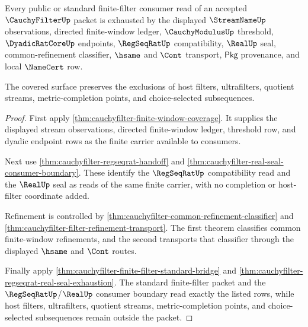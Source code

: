 \begin{theorem}
\label{thm:cauchyfilter-finite-filter-mature-coverage}
Every public or standard finite-filter consumer read of an accepted
$\CauchyFilterUp$ packet is exhausted by the displayed $\StreamNameUp$
observations, directed finite-window ledger, $\CauchyModulusUp$ threshold,
$\DyadicRatCoreUp$ endpoints, $\RegSeqRatUp$ compatibility, $\RealUp$ seal,
common-refinement classifier, $\hsame$ and $\Cont$ transport,
$\mathsf{Pkg}$ provenance, and local $\NameCert$ row.

The covered surface preserves the exclusions of host filters, ultrafilters,
quotient streams, metric-completion points, and choice-selected subsequences.
\end{theorem}
\begin{proof}
First apply \autoref{thm:cauchyfilter-finite-window-coverage}. It supplies the
displayed stream observations, directed finite-window ledger, threshold row,
and dyadic endpoint rows as the finite carrier available to consumers.

Next use \autoref{thm:cauchyfilter-regseqrat-handoff} and
\autoref{thm:cauchyfilter-real-seal-consumer-boundary}. These identify the
$\RegSeqRatUp$ compatibility read and the $\RealUp$ seal as reads of the same
finite carrier, with no completion or host-filter coordinate added.

Refinement is controlled by
\autoref{thm:cauchyfilter-common-refinement-classifier} and
\autoref{thm:cauchyfilter-filter-refinement-transport}. The first theorem
classifies common finite-window refinements, and the second transports that
classifier through the displayed $\hsame$ and $\Cont$ routes.

Finally apply \autoref{thm:cauchyfilter-finite-filter-standard-bridge} and
\autoref{thm:cauchyfilter-regseqrat-real-seal-exhaustion}. The standard
finite-filter packet and the $\RegSeqRatUp$/$\RealUp$ consumer boundary read
exactly the listed rows, while host filters, ultrafilters, quotient streams,
metric-completion points, and choice-selected subsequences remain outside the
packet.
\end{proof}

